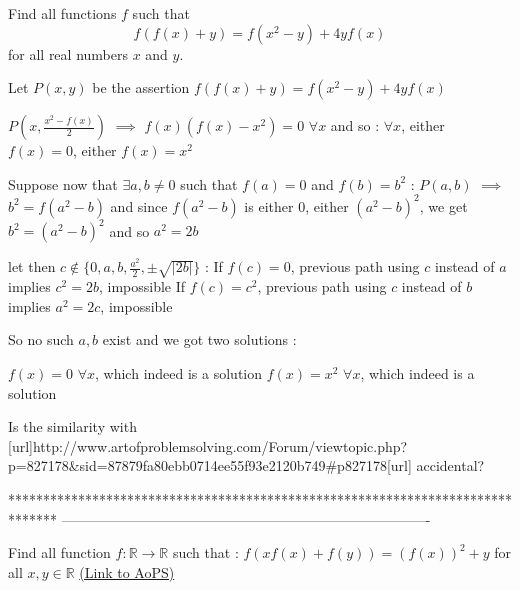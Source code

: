 \begin{solution}
	\begin{tcolorbox}Find all functions $f$ such that
\[f(f(x) + y) = f(x^2-y) + 4yf(x)\]
for all real numbers $x$ and $y$.\end{tcolorbox}
Let $P(x,y)$ be the assertion $f(f(x)+y)=f(x^2-y)+4yf(x)$

$P(x,\frac{x^2-f(x)}2)$ $\implies$ $f(x)(f(x)-x^2)=0$ $\forall x$ and so : $\forall x$, either $f(x)=0$, either $f(x)=x^2$

Suppose now that $\exists a,b\ne 0$ such that $f(a)=0$ and $f(b)=b^2$ :
$P(a,b)$ $\implies$ $b^2=f(a^2-b)$ and since $f(a^2-b)$ is either $0$, either $(a^2-b)^2$, we get $b^2=(a^2-b)^2$ and so $a^2=2b$

let then $c\notin\{0,a,b,\frac{a^2}2,\pm\sqrt{|2b|}\}$ : 
If $f(c)=0$, previous path using $c$ instead of $a$ implies $c^2=2b$, impossible
If $f(c)=c^2$, previous path using $c$ instead of $b$ implies $a^2=2c$, impossible

So no such $a,b$ exist and we got two solutions :

$f(x)=0$ $\forall x$, which indeed is a solution
$f(x)=x^2$ $\forall x$, which indeed is a solution
\end{solution}



\begin{solution}
	Is the similarity with [url]http://www.artofproblemsolving.com/Forum/viewtopic.php?p=827178&sid=87879fa80ebb0714ee55f93e2120b749#p827178[\/url] accidental?
\end{solution}
*******************************************************************************
-------------------------------------------------------------------------------

\begin{problem}
	Find all function $ f:\mathbb{R}\rightarrow\mathbb{R} $ such that :
$ f(xf(x)+f(y)) = (f(x))^2+y $ for all $ x, y\in\mathbb{R} $
	\flushright \href{https://artofproblemsolving.com/community/c6h531042}{(Link to AoPS)}
\end{problem}



